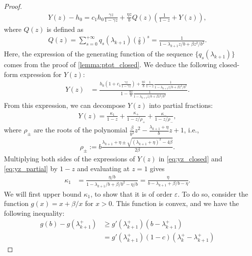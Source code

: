 \documentclass{article}
\theoremstyle{plain}
\theoremstyle{definition}
\theoremstyle{remark}
\begin{document}
\begin{proof}
  \begin{align*}
    Y(z) - h_0 = c_1 h_0 \frac{\gamma z}{1 - \gamma z} + \frac{\eta z }{b} Q(z) \left(\frac{1}{1-z} + Y(z)\right),
  \end{align*}
  where $Q(z)$ is defined as 
  \begin{align*}
    Q(z) = \sum_{s=0}^{+\infty} q_s(\lambda_{k+1}) \left(\frac{z}{b}\right)^s = \frac{1}{1 - \lambda_{k+1}z/b + \beta z^2 / b^2}.
  \end{align*}
  Here, the expression of the generating function of the sequence $\{q_s(\lambda_{k+1})\}$ comes from the proof of \cref{lemma:ptqt_closed}. We deduce the following closed-form expression for $Y(z)$:
  \begin{align}\label{eq:yz_closed}
    Y(z) & = \frac{h_0 \left(1 + c_1 \frac{\gamma z}{1 - \gamma z}\right) + \frac{\eta z}{b} \frac{1}{1-z} \frac{1}{1 - \lambda_{k+1}z/b + \beta z^2 / b^2}}{1 - \frac{\eta z}{b} \frac{1}{1 - \lambda_{k+1}z/b + \beta z^2 / b^2}}.
  \end{align}
  From this expression, we can decompose $Y(z)$ into partial fractions:
  \begin{align}\label{eq:yz_partial}
    Y(z) = \frac{\kappa_1}{1-z} + \frac{\kappa_+}{1 - z/\rho_+} + \frac{\kappa_-}{1 - z/\rho_-},
  \end{align}
  where $\rho_\pm$ are the roots of the polynomial $\frac{\beta}{b^2} z^2 - \frac{\lambda_{k+1} + \eta}{b} z + 1$, i.e.,
  \begin{align*}
    \rho_\pm := b \frac{\lambda_{k+1} + \eta \pm \sqrt{(\lambda_{k+1} + \eta)^2 - 4\beta}}{2\beta}.
  \end{align*}
  Multiplying both sides of the expressions of $Y(z)$ in \eqref{eq:yz_closed} and \eqref{eq:yz_partial} by $1-z$ and evaluating at $z=1$ gives
  \begin{align}\label{eq:kappa_plusminus_smallbeta}
    \kappa_1 & = \frac{\eta / b}{1 - \lambda_{k+1}/b + \beta / b^2 - \eta / b} = \frac{\eta}{b - \lambda_{k+1} + \beta / b - \eta}.
  \end{align}
  We will first upper bound $\kappa_1$, to show that it is of order $\varepsilon$. To do so, consider the function $g(x) = x + \beta / x$ for $x > 0$. This function is convex, and we have the following inequality:
  \begin{align*}
    g(b) - g(\lambda_{k+1}^+) & \geqslant g'(\lambda_{k+1}^+)(b - \lambda_{k+1}^+) \\
    & = g'(\lambda_{k+1}^+)(1-c) (\lambda_k^+ - \lambda_{k+1}^+)
  \end{align*}

\end{proof}
\end{document}
